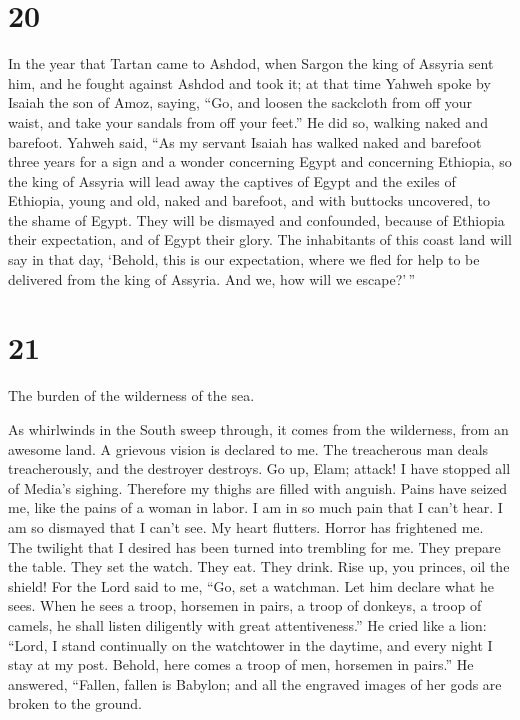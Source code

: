 \hypertarget{section-19}{%
\section{20}\label{section-19}}

 In the year that Tartan came to Ashdod, when Sargon the
king of Assyria sent him, and he fought against Ashdod and took it;
 at that time Yahweh spoke by Isaiah the son of Amoz,
saying, ``Go, and loosen the sackcloth from off your waist, and take
your sandals from off your feet.'' He did so, walking naked and
barefoot.  Yahweh said, ``As my servant Isaiah has walked
naked and barefoot three years for a sign and a wonder concerning Egypt
and concerning Ethiopia,  so the king of Assyria will lead
away the captives of Egypt and the exiles of Ethiopia, young and old,
naked and barefoot, and with buttocks uncovered, to the shame of Egypt.
 They will be dismayed and confounded, because of Ethiopia
their expectation, and of Egypt their glory.  The
inhabitants of this coast land will say in that day, `Behold, this is
our expectation, where we fled for help to be delivered from the king of
Assyria. And we, how will we escape?'\,''

\hypertarget{section-20}{%
\section{21}\label{section-20}}

 The burden of the wilderness of the sea.

As whirlwinds in the South sweep through, it comes from the wilderness,
from an awesome land.  A grievous vision is declared to me.
The treacherous man deals treacherously, and the destroyer destroys. Go
up, Elam; attack! I have stopped all of Media's sighing. 
Therefore my thighs are filled with anguish. Pains have seized me, like
the pains of a woman in labor. I am in so much pain that I can't hear. I
am so dismayed that I can't see.  My heart flutters. Horror
has frightened me. The twilight that I desired has been turned into
trembling for me.  They prepare the table. They set the
watch. They eat. They drink. Rise up, you princes, oil the shield!
 For the Lord said to me, ``Go, set a watchman. Let him
declare what he sees.  When he sees a troop, horsemen in
pairs, a troop of donkeys, a troop of camels, he shall listen diligently
with great attentiveness.''  He cried like a lion: ``Lord, I
stand continually on the watchtower in the daytime, and every night I
stay at my post.  Behold, here comes a troop of men,
horsemen in pairs.'' He answered, ``Fallen, fallen is Babylon; and all
the engraved images of her gods are broken to the ground.

